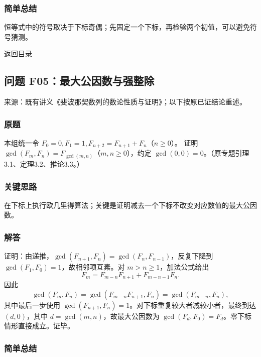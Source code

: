\documentclass[11pt,a4paper]{article}
\begin{document}
\subsubsection{简单总结}\label{ux7b80ux5355ux603bux7ed3-36}

恒等式中的符号取决于下标奇偶；先固定一个下标，再检验两个初值，可以避免符号猜测。

\noindent\hyperref[contents]{返回目录}

\subsection{问题
F05：最大公因数与强整除}\label{ux95eeux9898-f05ux6700ux5927ux516cux56e0ux6570ux4e0eux5f3aux6574ux9664}

来源：既有讲义《斐波那契数列的数论性质与证明》；以下按原已证结论重述。

\subsubsection{原题}\label{ux539fux9898-37}

本组统一令 \(F_0=0,F_1=1,F_{n+2}=F_{n+1}+F_n\)（\(n\ge0\)）。 证明
\(\gcd(F_m,F_n)=F_{\gcd(m,n)}\)（\(m,n\ge0\)），约定
\(\gcd(0,0)=0\)。（原专题引理3.1、定理3.2、推论3.3。）

\subsubsection{关键思路}\label{ux5173ux952eux601dux8def-37}

在下标上执行欧几里得算法；关键是证明减去一个下标不改变对应数值的最大公因数。

\subsubsection{解答}\label{ux89e3ux7b54-37}

证明：由递推，\(\gcd(F_{n+1},F_n)=\gcd(F_n,F_{n-1})\)，反复下降到
\(\gcd(F_1,F_0)=1\)，故相邻项互素。对 \(m>n\ge1\)，加法公式给出
\[F_m=F_{m-n}F_{n+1}+F_{m-n-1}F_n.\] 因此
\[\gcd(F_m,F_n)=\gcd(F_{m-n}F_{n+1},F_n)=\gcd(F_{m-n},F_n),\]
其中最后一步使用
\(\gcd(F_{n+1},F_n)=1\)。对下标重复较大者减较小者，最终到达
\((d,0)\)，其中 \(d=\gcd(m,n)\)，故最大公因数为
\(\gcd(F_d,F_0)=F_d\)。零下标情形直接成立。证毕。

\subsubsection{简单总结}\label{ux7b80ux5355ux603bux7ed3-37}
\end{document}

